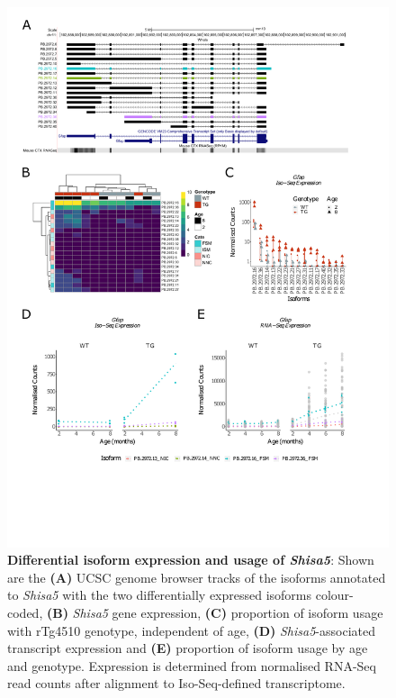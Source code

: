 \begin{figure}[!htp]
	\centering
	\includegraphics[page=5,trim={1.5cm 1.5cm 2cm 1cm}, scale = 0.80]{Figures/Ch5_DiffPlots.pdf}
	\captionsetup{width=0.95\textwidth}
	\caption[Differential isoform expression and usage of \textit{Shisa5}]%
	{\textbf{Differential isoform expression and usage of \textit{Shisa5}}: Shown are the \textbf{(A)}  UCSC genome browser tracks of the isoforms annotated to \textit{Shisa5} with the two differentially expressed isoforms colour-coded, \textbf{(B)} \textit{Shisa5} gene expression, \textbf{(C)} proportion of isoform usage with rTg4510 genotype, independent of age, \textbf{(D)} \textit{Shisa5}-associated transcript expression and \textbf{(E)} proportion of isoform usage by age and genotype. Expression is determined from normalised RNA-Seq read counts after alignment to Iso-Seq-defined transcriptome.} 
	\label{fig:DIU_shisa5}
\end{figure}

